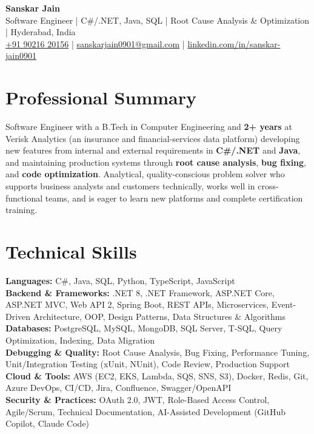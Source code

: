 \documentclass[a4paper,10pt]{article}
\begin{document}
\begin{center}
    {\LARGE \textbf{Sanskar Jain}} \\
    \vspace{2pt}
    Software Engineer \;|\; C\#/.NET, Java, SQL \;|\; Root Cause Analysis \& Optimization \;|\; Hyderabad, India \\
    \vspace{2pt}
    \href{tel:+919021620156}{+91 90216 20156} \;|\;
    \href{mailto:sanskarjain0901@gmail.com}{sanskarjain0901@gmail.com} \;|\;
    \href{https://www.linkedin.com/in/sanskar-jain0901/}{linkedin.com/in/sanskar-jain0901}
\end{center}

\section*{Professional Summary}
Software Engineer with a B.Tech in Computer Engineering and \textbf{2+ years} at Verisk Analytics (an insurance and financial-services data platform) developing new features from internal and external requirements in \textbf{C\#/.NET} and \textbf{Java}, and maintaining production systems through \textbf{root cause analysis}, \textbf{bug fixing}, and \textbf{code optimization}.
Analytical, quality-conscious problem solver who supports business analysts and customers technically, works well in cross-functional teams, and is eager to learn new platforms and complete certification training.

\section*{Technical Skills}
\begin{sloppypar}
\noindent
\textbf{Languages:} C\#, Java, SQL, Python, TypeScript, JavaScript \\
\textbf{Backend \& Frameworks:} .NET 8, .NET Framework, ASP.NET Core, ASP.NET MVC, Web API 2, Spring Boot, REST APIs, Microservices, Event-Driven Architecture, OOP, Design Patterns, Data Structures \& Algorithms \\
\textbf{Databases:} PostgreSQL, MySQL, MongoDB, SQL Server, T-SQL, Query Optimization, Indexing, Data Migration \\
\textbf{Debugging \& Quality:} Root Cause Analysis, Bug Fixing, Performance Tuning, Unit/Integration Testing (xUnit, NUnit), Code Review, Production Support \\
\textbf{Cloud \& Tools:} AWS (EC2, EKS, Lambda, SQS, SNS, S3), Docker, Redis, Git, Azure DevOps, CI/CD, Jira, Confluence, Swagger/OpenAPI \\
\textbf{Security \& Practices:} OAuth 2.0, JWT, Role-Based Access Control, Agile/Scrum, Technical Documentation, AI-Assisted Development (GitHub Copilot, Claude Code)
\end{sloppypar}
\end{document}
